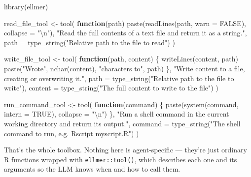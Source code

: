 \documentclass[
  letterpaper,
  DIV=11,
  numbers=noendperiod]{scrreprt}
\newenvironment{Shaded}{\begin{snugshade}}{\end{snugshade}}
\newcommand{\AttributeTok}[1]{\textcolor[rgb]{0.40,0.45,0.13}{#1}}
\newcommand{\ConstantTok}[1]{\textcolor[rgb]{0.56,0.35,0.01}{#1}}
\newcommand{\ControlFlowTok}[1]{\textcolor[rgb]{0.00,0.23,0.31}{\textbf{#1}}}
\newcommand{\FunctionTok}[1]{\textcolor[rgb]{0.28,0.35,0.67}{#1}}
\newcommand{\NormalTok}[1]{\textcolor[rgb]{0.00,0.23,0.31}{#1}}
\newcommand{\OtherTok}[1]{\textcolor[rgb]{0.00,0.23,0.31}{#1}}
\newcommand{\SpecialCharTok}[1]{\textcolor[rgb]{0.37,0.37,0.37}{#1}}
\newcommand{\StringTok}[1]{\textcolor[rgb]{0.13,0.47,0.30}{#1}}
\begin{document}
\begin{Shaded}
\begin{Highlighting}[]
\FunctionTok{library}\NormalTok{(ellmer)}

\NormalTok{read\_file\_tool }\OtherTok{\textless{}{-}} \FunctionTok{tool}\NormalTok{(}
  \ControlFlowTok{function}\NormalTok{(path) }\FunctionTok{paste}\NormalTok{(}\FunctionTok{readLines}\NormalTok{(path, }\AttributeTok{warn =} \ConstantTok{FALSE}\NormalTok{), }\AttributeTok{collapse =} \StringTok{"}\SpecialCharTok{\textbackslash{}n}\StringTok{"}\NormalTok{),}
  \StringTok{"Read the full contents of a text file and return it as a string."}\NormalTok{,}
  \AttributeTok{path =} \FunctionTok{type\_string}\NormalTok{(}\StringTok{"Relative path to the file to read"}\NormalTok{)}
\NormalTok{)}

\NormalTok{write\_file\_tool }\OtherTok{\textless{}{-}} \FunctionTok{tool}\NormalTok{(}
  \ControlFlowTok{function}\NormalTok{(path, content) \{}
    \FunctionTok{writeLines}\NormalTok{(content, path)}
    \FunctionTok{paste}\NormalTok{(}\StringTok{"Wrote"}\NormalTok{, }\FunctionTok{nchar}\NormalTok{(content), }\StringTok{"characters to"}\NormalTok{, path)}
\NormalTok{  \},}
  \StringTok{"Write content to a file, creating or overwriting it."}\NormalTok{,}
  \AttributeTok{path =} \FunctionTok{type\_string}\NormalTok{(}\StringTok{"Relative path to the file to write"}\NormalTok{),}
  \AttributeTok{content =} \FunctionTok{type\_string}\NormalTok{(}\StringTok{"The full content to write to the file"}\NormalTok{)}
\NormalTok{)}

\NormalTok{run\_command\_tool }\OtherTok{\textless{}{-}} \FunctionTok{tool}\NormalTok{(}
  \ControlFlowTok{function}\NormalTok{(command) \{}
    \FunctionTok{paste}\NormalTok{(}\FunctionTok{system}\NormalTok{(command, }\AttributeTok{intern =} \ConstantTok{TRUE}\NormalTok{), }\AttributeTok{collapse =} \StringTok{"}\SpecialCharTok{\textbackslash{}n}\StringTok{"}\NormalTok{)}
\NormalTok{  \},}
  \StringTok{"Run a shell command in the current working directory and return its output."}\NormalTok{,}
  \AttributeTok{command =} \FunctionTok{type\_string}\NormalTok{(}\StringTok{"The shell command to run, e.g. \textquotesingle{}Rscript myscript.R\textquotesingle{}"}\NormalTok{)}
\NormalTok{)}
\end{Highlighting}
\end{Shaded}

That's the whole toolbox. Nothing here is agent-specific --- they're
just ordinary R functions wrapped with \texttt{ellmer::tool()}, which
describes each one and its arguments so the LLM knows when and how to
call them.
\end{document}
